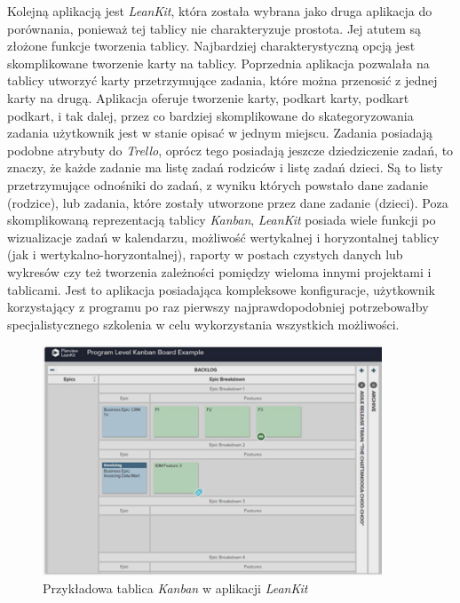 \indent Kolejną aplikacją jest \textit{LeanKit}, która została wybrana jako druga aplikacja do porównania, ponieważ tej tablicy nie charakteryzuje prostota. Jej atutem są złożone funkcje tworzenia tablicy. Najbardziej charakterystyczną opcją jest skomplikowane tworzenie karty na tablicy. Poprzednia aplikacja pozwalała na tablicy utworzyć karty przetrzymujące zadania, które można przenosić z jednej karty na drugą. Aplikacja oferuje tworzenie karty, podkart karty, podkart podkart, i tak dalej, przez co bardziej skomplikowane do skategoryzowania zadania użytkownik jest w stanie opisać w jednym miejscu. Zadania posiadają podobne atrybuty do \textit{Trello}, oprócz tego posiadają jeszcze dziedziczenie zadań, to znaczy, że każde zadanie ma listę zadań rodziców i listę zadań dzieci. Są to listy przetrzymujące odnośniki do zadań, z wyniku których powstało dane zadanie (rodzice), lub zadania, które zostały utworzone przez dane zadanie (dzieci). 
Poza skomplikowaną reprezentacją tablicy \textit{Kanban}, \textit{LeanKit} posiada wiele funkcji po wizualizacje zadań w kalendarzu, możliwość wertykalnej i horyzontalnej tablicy (jak i wertykalno-horyzontalnej), raporty w postach czystych danych lub wykresów czy też tworzenia zależności pomiędzy wieloma innymi projektami i tablicami.
Jest to aplikacja posiadająca kompleksowe konfiguracje, użytkownik korzystający z programu po raz pierwszy najprawdopodobniej potrzebowałby specjalistycznego szkolenia w celu wykorzystania wszystkich możliwości.

\begin{figure}[h]
	\centering
	\includegraphics[width=0.90\textwidth]{leankit}		
	\caption{Przykładowa tablica \textit{Kanban} w aplikacji \textit{LeanKit}}
\end{figure}


